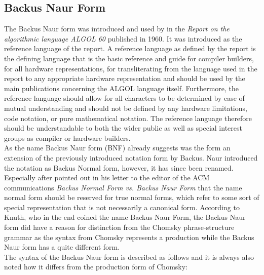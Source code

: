 \documentclass{article}
\begin{document}
\subsection{Backus Naur Form}
The Backus Naur form was introduced and used by \citet{backus1960report} in the \textit{Report on the algorithmic language ALGOL 60} published in 1960. It was introduced as the reference language of the report. A reference language as defined by the report is the defining language that is the basic reference and guide for compiler builders, for all hardware representations, for transliterating from the language used in the report to any appropriate hardware representation and should be used by the main publications concerning the ALGOL language itself. Furthermore, the reference language should allow for all characters to be determined by ease of mutual understanding and should not be defined by any hardware limitations, code notation, or pure mathematical notation. The reference language therefore should be understandable to both the wider public as well as special interest groups as compiler or hardware builders. 
\\
As the name Backus Naur form (BNF) already suggests was the form an extension of the previously introduced notation form by Backus.  Naur introduced the notation as Backus Normal form, however, it has since been renamed. Especially after \citet{knuth-ba} pointed out in his letter to the editor of the ACM communications \textit{Backus Normal Form vs. Backus Naur Form} that the name normal form should be reserved for true normal forms, which refer to some sort of special representation that is not necessarily a canonical form. According to Knuth, who in the end coined the name Backus Naur Form, the Backus Naur form did have a reason for distinction from the Chomsky phrase-structure grammar as the syntax from Chomsky represents a production while the Backus Naur form has a quite different form.
\\
The syntax of the Backus Naur form is described as follows and it is always also noted how it differs from the production form of Chomsky:
\end{document}
